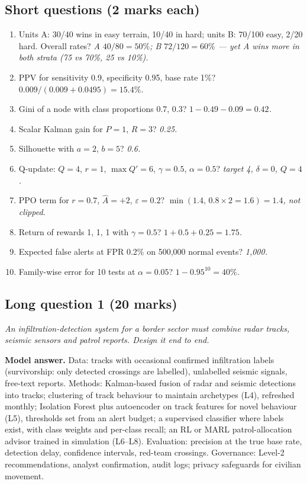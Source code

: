 \documentclass[11pt]{article}
\begin{document}
\subsection{Short questions (2 marks each)}
\begin{enumerate}
\item Units A: 30/40 wins in easy terrain, 10/40 in hard; units B: 70/100 easy, 2/20 hard. Overall rates? \emph{A $40/80=50\%$; B $72/120=60\%$ --- yet A wins more in both strata (75 vs 70\%, 25 vs 10\%).}
\item PPV for sensitivity 0.9, specificity 0.95, base rate 1\%? \emph{$0.009/(0.009+0.0495)=15.4\%$.}
\item Gini of a node with class proportions 0.7, 0.3? \emph{$1-0.49-0.09=0.42$.}
\item Scalar Kalman gain for $P=1$, $R=3$? \emph{0.25.}
\item Silhouette with $a=2$, $b=5$? \emph{0.6.}
\item Q-update: $Q=4$, $r=1$, $\max Q'=6$, $\gamma=0.5$, $\alpha=0.5$? \emph{target 4, $\delta=0$, $Q=4$.}
\item PPO term for $r=0.7$, $\hat A=+2$, $\varepsilon=0.2$? \emph{$\min(1.4,\,0.8\times2=1.6)=1.4$, not clipped.}
\item Return of rewards 1, 1, 1 with $\gamma=0.5$? \emph{$1+0.5+0.25=1.75$.}
\item Expected false alerts at FPR 0.2\% on 500,000 normal events? \emph{1,000.}
\item Family-wise error for 10 tests at $\alpha=0.05$? \emph{$1-0.95^{10}=40\%$.}
\end{enumerate}

\subsection{Long question 1 (20 marks)}
\emph{An infiltration-detection system for a border sector must combine radar tracks, seismic sensors and patrol reports. Design it end to end.}

\textbf{Model answer.} Data: tracks with occasional confirmed infiltration labels (survivorship: only detected crossings are labelled), unlabelled seismic signals, free-text reports. Methods: Kalman-based fusion of radar and seismic detections into tracks; clustering of track behaviour to maintain archetypes (L4), refreshed monthly; Isolation Forest plus autoencoder on track features for novel behaviour (L5), thresholds set from an alert budget; a supervised classifier where labels exist, with class weights and per-class recall; an RL or MARL patrol-allocation advisor trained in simulation (L6--L8). Evaluation: precision at the true base rate, detection delay, confidence intervals, red-team crossings. Governance: Level-2 recommendations, analyst confirmation, audit logs; privacy safeguards for civilian movement.
\end{document}
